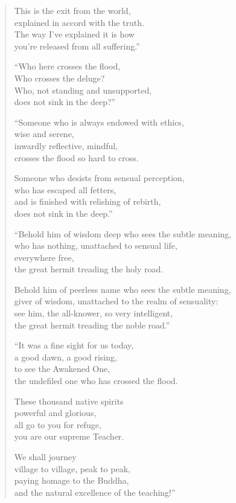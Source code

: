 \documentclass[12pt,openany]{book}%
\begin{document}
\begin{verse}
This is the exit from the world, \\
explained in accord with the truth. \\
The way I’ve explained it is how \\
you’re released from all suffering.” 

“Who here crosses the flood, \\
Who crosses the deluge? \\
Who, not standing and unsupported, \\
does not sink in the deep?” 

“Someone who is always endowed with ethics, \\
wise and serene, \\
inwardly reflective, mindful, \\
crosses the flood so hard to cross. 

Someone who desists from sensual perception, \\
who has escaped all fetters, \\
and is finished with relishing of rebirth, \\
does not sink in the deep.” 

“Behold him of wisdom deep who sees the subtle meaning, \\
who has nothing, unattached to sensual life, \\
everywhere free, \\
the great hermit treading the holy road. 

Behold him of peerless name who sees the subtle meaning, \\
giver of wisdom, unattached to the realm of sensuality: \\
see him, the all-knower, so very intelligent, \\
the great hermit treading the noble road.” 

“It was a fine sight for us today, \\
a good dawn, a good rising, \\
to see the Awakened One, \\
the undefiled one who has crossed the flood. 

These thousand native spirits \\
powerful and glorious, \\
all go to you for refuge, \\
you are our supreme Teacher. 

We shall journey \\
village to village, peak to peak, \\
paying homage to the Buddha, \\
and the natural excellence of the teaching!” 

%
\end{verse}
\end{document}
